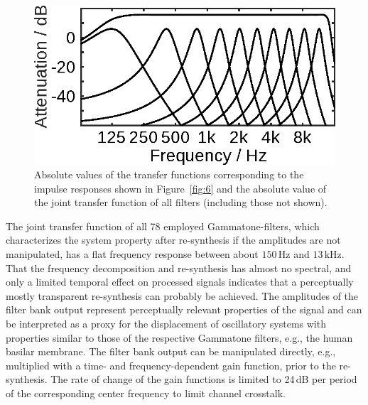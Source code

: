 \documentclass[10pt,a4paper,twocolumn]{article}
\begin{document}
%
\begin{figure}
	\centerline{\includegraphics[width=.65\columnwidth]{images/gammatone_filter_transfer}}
	\caption{Absolute values of the transfer functions corresponding to the impulse responses shown in Figure~\ref{fig:6} and the absolute value of the joint transfer function of all filters (including those not shown).}
	\label{fig:7}
\end{figure} 
%
The joint transfer function of all 78 employed Gammatone-filters, which characterizes the system property after re-synthesis if the amplitudes are not manipulated, has a flat frequency response between about $150\,\text{Hz}$ and $13\,\text{kHz}$.
%
That the frequency decomposition and re-synthesis has almost no spectral, and only a limited temporal effect on processed signals indicates that a perceptually mostly transparent re-synthesis can probably be achieved.
%
The amplitudes of the filter bank output represent perceptually relevant properties of the signal and can be interpreted as a proxy for the displacement of oscillatory systems with properties similar to those of the respective Gammatone filters, e.g., the human basilar membrane.
%
The filter bank output can be manipulated directly, e.g., multiplied with a time- and frequency-dependent gain function, prior to the re-synthesis.
%
The rate of change of the gain functions is limited to 24\,dB per period of the corresponding center frequency to limit channel crosstalk.
\end{document}
